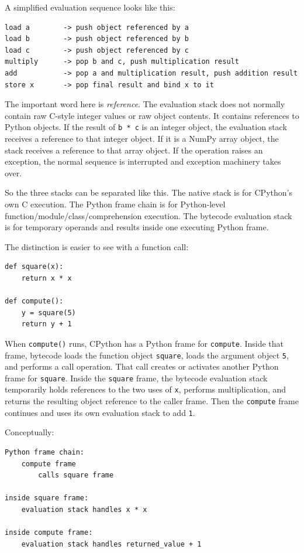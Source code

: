 A simplified evaluation sequence looks like this:

\begin{verbatim}
load a        -> push object referenced by a
load b        -> push object referenced by b
load c        -> push object referenced by c
multiply      -> pop b and c, push multiplication result
add           -> pop a and multiplication result, push addition result
store x       -> pop final result and bind x to it
\end{verbatim}

The important word here is \emph{reference}. The evaluation stack does not normally contain raw C-style integer values or raw object contents. It contains references to Python objects. If the result of \texttt{b * c} is an integer object, the evaluation stack receives a reference to that integer object. If it is a NumPy array object, the stack receives a reference to that array object. If the operation raises an exception, the normal sequence is interrupted and exception machinery takes over.

So the three stacks can be separated like this. The native stack is for CPython's own C execution. The Python frame chain is for Python-level function/module/class/comprehension execution. The bytecode evaluation stack is for temporary operands and results inside one executing Python frame.

The distinction is easier to see with a function call:

\begin{verbatim}
def square(x):
    return x * x

def compute():
    y = square(5)
    return y + 1
\end{verbatim}

When \texttt{compute()} runs, CPython has a Python frame for \texttt{compute}. Inside that frame, bytecode loads the function object \texttt{square}, loads the argument object \texttt{5}, and performs a call operation. That call creates or activates another Python frame for \texttt{square}. Inside the \texttt{square} frame, the bytecode evaluation stack temporarily holds references to the two uses of \texttt{x}, performs multiplication, and returns the resulting object reference to the caller frame. Then the \texttt{compute} frame continues and uses its own evaluation stack to add \texttt{1}.

Conceptually:

\begin{verbatim}
Python frame chain:
    compute frame
        calls square frame

inside square frame:
    evaluation stack handles x * x

inside compute frame:
    evaluation stack handles returned_value + 1
\end{verbatim}

